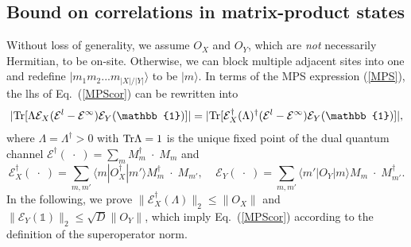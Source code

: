 \documentclass{tADP2e}
\theoremstyle{plain}
\theoremstyle{plain}
\theoremstyle{definition}
\begin{document}
\begin{appendices}
\section{Bound on correlations in matrix-product states}\label{app3}
Without loss of generality, we assume $O_X$ and $O_Y$, which are \emph{not} necessarily Hermitian, to be on-site. Otherwise, we can block multiple adjacent sites into one and redefine $|m_1m_2...m_{|X|/|Y|}\rangle$ to be $|m\rangle$. In terms of the MPS expression (\ref{MPS}), the lhs of Eq.~(\ref{MPScor}) can be rewritten into 
\begin{equation}
|{\rm Tr}[\Lambda\mathcal{E}_X(\mathcal{E}^l-\mathcal{E}^\infty)\mathcal{E}_Y(\mathbb{1})]|=|{\rm Tr}[\mathcal{E}_X^\dag(\Lambda)^\dag(\mathcal{E}^l-\mathcal{E}^\infty)\mathcal{E}_Y(\mathbb{1})]|, 
\end{equation}
where $\Lambda=\Lambda^\dag>0$ with ${\rm Tr}\Lambda=1$ is the unique fixed point of the dual quantum channel $\mathcal{E}^\dag(\;\cdot\;)=\sum_m M_m^\dag\;\cdot\;M_m$ and 
\begin{equation}
\mathcal{E}_X^\dag(\;\cdot\;)=\sum_{m,m'} \langle m|O_X^\dag|m'\rangle M_m^\dag\;\cdot\;M_{m'},\;\;\;\;
\mathcal{E}_Y(\;\cdot\;)=\sum_{m,m'} \langle m'|O_Y|m\rangle M_m\;\cdot\;M_{m'}^\dag.
\end{equation}
In the following, we prove $\|\mathcal{E}_X^\dag (\Lambda)\|_2\le\|O_X\|$ and $\|\mathcal{E}_Y(\mathbb{1})\|_2\le\sqrt{D}\|O_Y\|$, which imply Eq.~(\ref{MPScor}) according to the definition of the superoperator norm.


\end{appendices}
\end{document}
